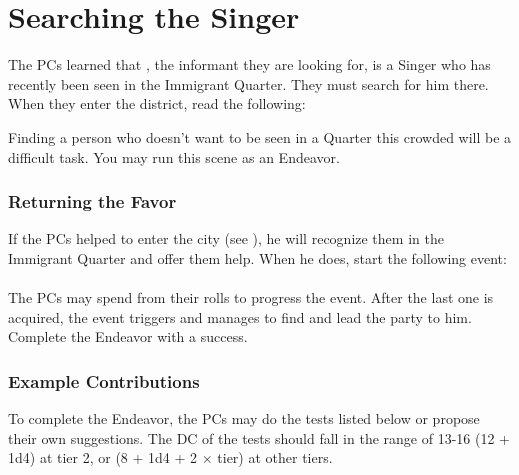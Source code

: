 \section{Searching the Singer}
\label{sec:searchForSinger}

The PCs learned that \npcInformant{}, the informant they are looking for, is a Singer who has recently been seen in the Immigrant Quarter. They must search for him there. When they enter the district, read the following:


Finding a person who doesn't want to be seen in a Quarter this crowded will be a difficult task. You may run this scene as an Endeavor.


\subsubsection{Returning the Favor}

If the PCs helped \npcImmigrant{} to enter the city (see ), he will recognize them in the Immigrant Quarter and offer them help. When he does, start the following event:\\

\\

The PCs may spend \iconOpp{} from their rolls to progress the event. After the last one is acquired, the event triggers and \npcImmigrant{} manages to find \npcInformant{} and lead the party to him. Complete the Endeavor with a success.

\subsubsection{Example Contributions}

To complete the Endeavor, the PCs may do the tests listed below or propose their own suggestions. The DC of the tests should fall in the range of 13-16 (12 + 1d4) at tier 2, or (8 + 1d4 + 2 $\times$ tier) at other tiers.


